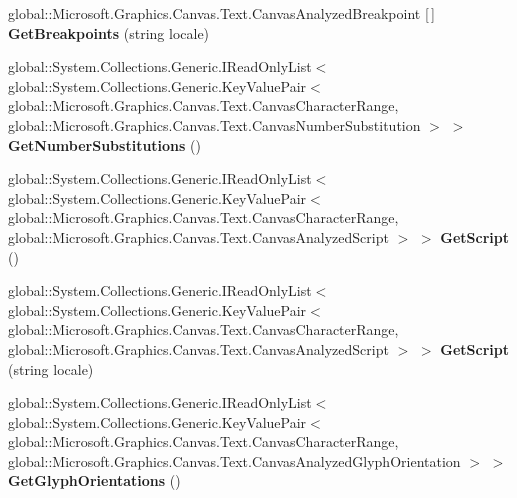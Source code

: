\begin{DoxyCompactItemize}
global\+::\+Microsoft.\+Graphics.\+Canvas.\+Text.\+Canvas\+Analyzed\+Breakpoint \mbox{[}$\,$\mbox{]} {\bfseries Get\+Breakpoints} (string locale)
\item 
\mbox{\label{class_microsoft_1_1_graphics_1_1_canvas_1_1_text_1_1_canvas_text_analyzer_ab7c0ac36c53cf72f84cbb4afc2027819}} 
global\+::\+System.\+Collections.\+Generic.\+I\+Read\+Only\+List$<$ global\+::\+System.\+Collections.\+Generic.\+Key\+Value\+Pair$<$ global\+::\+Microsoft.\+Graphics.\+Canvas.\+Text.\+Canvas\+Character\+Range, global\+::\+Microsoft.\+Graphics.\+Canvas.\+Text.\+Canvas\+Number\+Substitution $>$ $>$ {\bfseries Get\+Number\+Substitutions} ()
\item 
\mbox{\label{class_microsoft_1_1_graphics_1_1_canvas_1_1_text_1_1_canvas_text_analyzer_a5433100913a09da60dd47164a91bfe82}} 
global\+::\+System.\+Collections.\+Generic.\+I\+Read\+Only\+List$<$ global\+::\+System.\+Collections.\+Generic.\+Key\+Value\+Pair$<$ global\+::\+Microsoft.\+Graphics.\+Canvas.\+Text.\+Canvas\+Character\+Range, global\+::\+Microsoft.\+Graphics.\+Canvas.\+Text.\+Canvas\+Analyzed\+Script $>$ $>$ {\bfseries Get\+Script} ()
\item 
\mbox{\label{class_microsoft_1_1_graphics_1_1_canvas_1_1_text_1_1_canvas_text_analyzer_a211990c1225d082a3ab504974c87963b}} 
global\+::\+System.\+Collections.\+Generic.\+I\+Read\+Only\+List$<$ global\+::\+System.\+Collections.\+Generic.\+Key\+Value\+Pair$<$ global\+::\+Microsoft.\+Graphics.\+Canvas.\+Text.\+Canvas\+Character\+Range, global\+::\+Microsoft.\+Graphics.\+Canvas.\+Text.\+Canvas\+Analyzed\+Script $>$ $>$ {\bfseries Get\+Script} (string locale)
\item 
\mbox{\label{class_microsoft_1_1_graphics_1_1_canvas_1_1_text_1_1_canvas_text_analyzer_afbf85c9284d7c890f62052a14192996c}} 
global\+::\+System.\+Collections.\+Generic.\+I\+Read\+Only\+List$<$ global\+::\+System.\+Collections.\+Generic.\+Key\+Value\+Pair$<$ global\+::\+Microsoft.\+Graphics.\+Canvas.\+Text.\+Canvas\+Character\+Range, global\+::\+Microsoft.\+Graphics.\+Canvas.\+Text.\+Canvas\+Analyzed\+Glyph\+Orientation $>$ $>$ {\bfseries Get\+Glyph\+Orientations} ()

\end{DoxyCompactItemize}
